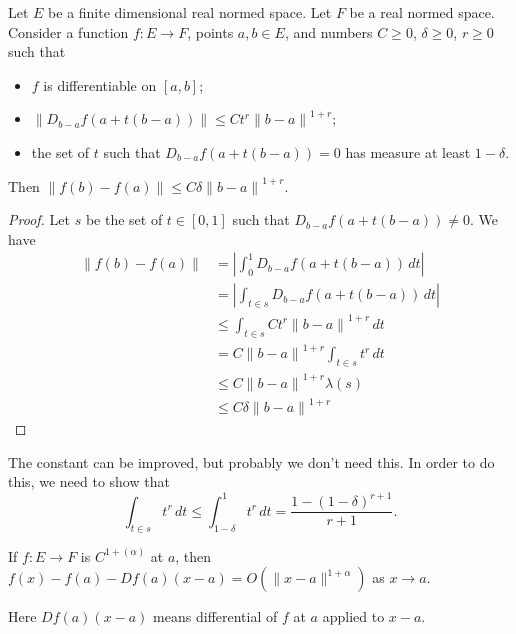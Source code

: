 \begin{lemma}%
  \label{lem:cdh-at-sub-affine-le-of-meas}
  Let \(E\) be a finite dimensional real normed space.
  Let \(F\) be a real normed space.
  Consider a function \(f\colon E\to F\), points \(a, b \in E\),
  and numbers \(C\ge 0\), \(\delta\ge 0\), \(r \ge 0\) such that
  \begin{itemize}
  \item \(f\) is differentiable on \([a, b]\);
  \item \(\|D_{b - a}f(a + t(b - a))\| \le Ct^{r}{\|b - a\|}^{1+r}\);
  \item the set of \(t\) such that \(D_{b - a}f(a + t(b - a)) = 0\)
    has measure at least \(1 - \delta\).
  \end{itemize}
  Then \(\|f(b) - f(a)\| \le C\delta{\|b - a\|}^{1+r}\).
\end{lemma}

\begin{proof}
  Let \(s\) be the set of \(t \in [0, 1]\) such that \(D_{b - a}f(a + t(b - a)) \ne 0\).
  We have
  \begin{align*}
    \|f(b) - f(a)\| &= \left|\int_{0}^{1} D_{b - a}f(a + t(b - a))\,dt\right| \\
                    &= \left|\int_{t\in s} D_{b - a}f(a + t(b - a))\,dt\right| \\
                    &\le \int_{t \in s} Ct^{r}{\|b - a\|}^{1+r}\,dt \\
                    &= C{\|b - a\|}^{1+r} \int_{t \in s}t^{r}\,dt \\
                    &\le C{\|b - a\|}^{1+r} \lambda(s) \\
                    &\le C\delta {\|b - a\|}^{1+r}
  \end{align*}
\end{proof}

\begin{remark}
  The constant can be improved, but probably we don't need this.
  In order to do this, we need to show that
  \[
    \int_{t \in s}t^{r}\,dt \le \int_{1 - \delta}^{1} t^{r}\,dt = \frac{1 - {(1 - \delta)}^{r + 1}}{r + 1}.
  \]
\end{remark}

\begin{lemma}%
  \label{lem:cdh-at-sub-affine-isBigO}
  If \(f\colon E \to F\) is \(C^{1+(\alpha)}\) at \(a\),
  then \(f(x) - f(a) - Df(a)(x - a) = O\left(\|x - a\|^{1 + \alpha}\right)\) as \(x \to a\).
\end{lemma}
Here \(Df(a)(x - a)\) means differential of \(f\) at \(a\) applied to \(x - a\).

